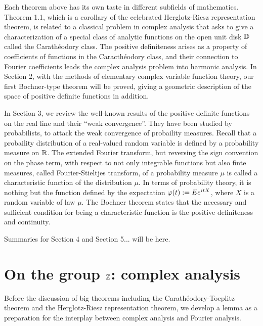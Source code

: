 \documentclass[12pt]{article}
\begin{document}
Each theorem above has its own taste in different subfields of mathematics.
Theorem 1.1, which is a corollary of the celebrated Herglotz-Riesz representation theorem, is related to a classical problem in complex analysis that asks to give a characterization of a special class of analytic functions on the open unit disk $\mathbb{D}$ called the Carath\'eodory class.
The positive definiteness arises as a property of coefficients of functions in the Caracth\'eodory class, and their connection to Fourier coefficients leads the complex analysis problem into harmonic analysis.
In Section 2, with the methods of elementary complex variable function theory, our first Bochner-type theorem will be proved, giving a geometric description of the space of positive definite functions in addition.

In Section 3, we review the well-known results of the positive definite functions on the real line and their ``weak convergence''.
They have been studied by probabilists, to attack the weak convergence of probaility measures.
Recall that a probaility distribution of a real-valued random variable is defined by a probability measure on $\mathbb{R}$.
The extended Fourier transform, but reversing the sign convention on the phase term, with respect to not only integrable functions but also finte measures, called Fourier-Stieltjes transform, of a probability measure $\mu$ is called a characteristic function of the distribution $\mu$.
In terms of probability theory, it is nothing but the function defined by the expectation $\varphi(t):=Ee^{itX}$, where $X$ is a random variable of law $\mu$.
The Bochner theorem states that the necessary and sufficient condition for being a characteristic function is the positive definiteness and continuity.

Summaries for Section 4 and Section 5... will be here.






\section{On the group $\mathbb{Z}$: complex analysis}

Before the discussion of big theorems including the Carath\'eodory-Toeplitz theorem and the Herglotz-Riesz representation theorem, we develop a lemma as a preparation for the interplay between complex analysis and Fourier analysis.
\end{document}

